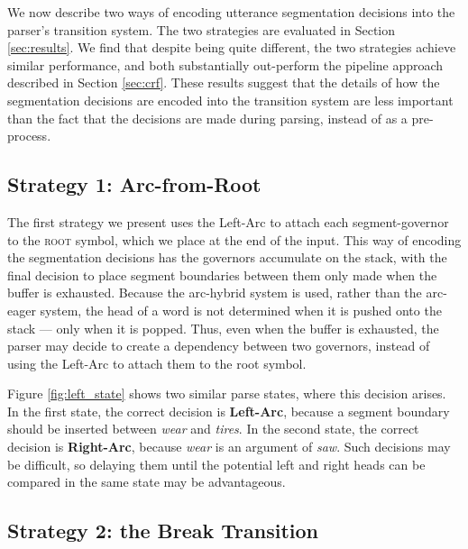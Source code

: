 \documentclass[11pt,letterpaper]{article}
\begin{document}
We now describe two ways of encoding utterance segmentation decisions into the
parser's transition system. 
The two strategies are evaluated in Section \ref{sec:results}.
We find that despite being quite different, the two strategies achieve similar
performance, and both substantially out-perform the pipeline approach described
in Section \ref{sec:crf}.  These results suggest that the details of how the
segmentation decisions are encoded into the transition system are less
important than the fact that the decisions are made during parsing, instead of
as a pre-process.

\subsection{Strategy 1: Arc-from-Root}

The first strategy we present uses the Left-Arc to attach each segment-governor
to the \textsc{root} symbol, which we place at the end of the input.
This way of encoding the segmentation decisions has the governors accumulate on
the stack, with the final decision to place segment boundaries between them only
made when the buffer is exhausted.  Because the arc-hybrid system is used, rather
than the arc-eager system, the head of a word is not determined when it is pushed
onto the stack --- only when it is popped.  Thus, even when the buffer is exhausted,
the parser may decide to create a dependency between two governors, instead of
using the Left-Arc to attach them to the root symbol.

Figure \ref{fig:left_state} shows two similar parse states, where this decision
arises.  In the first state, the correct decision is \textbf{Left-Arc}, because
a segment boundary should be inserted between \emph{wear} and \emph{tires}.
In the second state, the correct decision is \textbf{Right-Arc}, because
\emph{wear} is an argument of \emph{saw}.  Such decisions may be difficult,
so delaying them until the potential left and right heads can be compared in the
same state may be advantageous.

\subsection{Strategy 2: the Break Transition}
\end{document}
